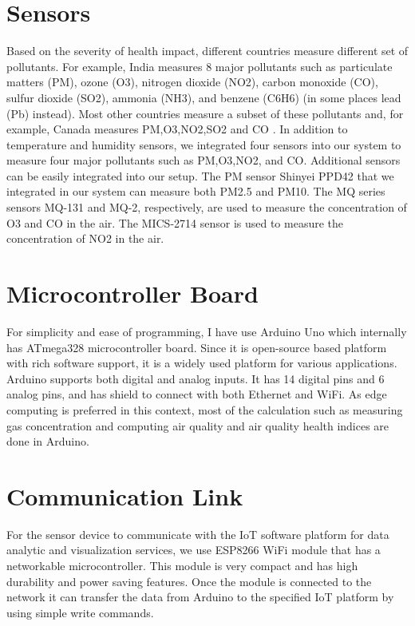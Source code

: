 \documentclass[10pt,a4paper]{report}
\begin{document}
\section{Sensors}

Based on the severity of health impact, different countries measure different set of pollutants. For example, India measures 8 major pollutants such as particulate matters (PM), ozone (O3), nitrogen dioxide (NO2), carbon monoxide (CO), sulfur dioxide (SO2), ammonia (NH3), and benzene (C6H6) (in some places lead (Pb) instead). Most other countries measure a subset of these pollutants and, for example, Canada measures PM,O3,NO2,SO2 and CO \cite{HR13}.
 In addition to temperature and humidity sensors, we integrated four sensors into our system to measure four major pollutants such as PM,O3,NO2, and CO. Additional sensors can be easily integrated into our setup. The PM sensor Shinyei PPD42 that we integrated in our system can measure both PM2.5 and PM10. The MQ series sensors MQ-131 and MQ-2, respectively, are used to measure the concentration of O3 and CO in the air. The MICS-2714 sensor is used to measure the concentration of NO2 in the air.
 \section{Microcontroller Board}
 For simplicity and ease of programming, I have use Arduino Uno which internally has ATmega328 microcontroller board. Since it is open-source based platform with rich software support, it is a widely used platform for various applications. Arduino supports both digital and analog inputs. It has 14 digital pins and 6 analog pins, and has shield to connect with both Ethernet and WiFi. As edge computing is preferred in this context, most of the calculation such as measuring gas concentration and computing air quality and air quality health indices are done in Arduino.


 \section{Communication Link}
 For the sensor device to communicate with the IoT software platform for data analytic and visualization services, we use ESP8266 WiFi module that has a networkable microcontroller. This module is very compact and has high durability and power saving features. Once the module is connected to the network it can transfer the data from Arduino to the specified IoT platform by using simple write commands.
\end{document}
